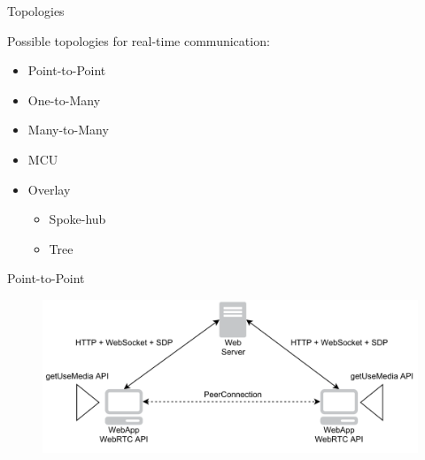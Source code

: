 \documentclass[first=red,second=purple,logo=yellowexc]{aaltoslides}
\begin{document}

%

\begin{frame}{Topologies}

Possible topologies for real-time communication:
\begin{itemize}
\item Point-to-Point
\item One-to-Many
\item Many-to-Many
\item MCU
\item Overlay
\begin{itemize}
\item Spoke-hub
\item Tree
\end{itemize}
\end{itemize}
\end{frame}

\begin{frame}{Point-to-Point}

\begin{figure}[h]
  \centering
  \includegraphics[width=1\textwidth]{webrtcExample.pdf}
\end{figure}
\end{frame}
\end{document}
